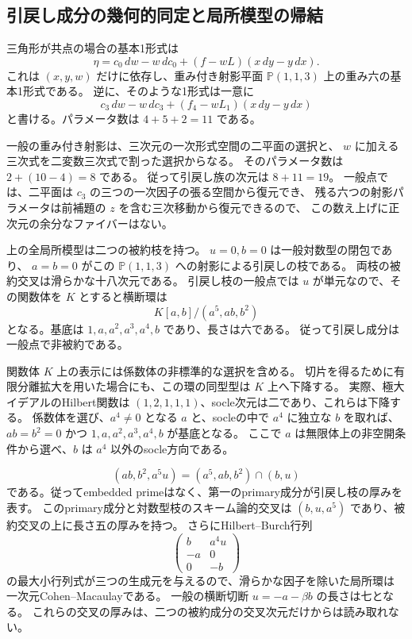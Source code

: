 \subsection{引戻し成分の幾何的同定と局所模型の帰結}

三角形が共点の場合の基本1形式は
\[
 \eta=c_0\,dw-w\,dc_0+(f-wL)(x\,dy-y\,dx).
\]
これは $(x,y,w)$ だけに依存し、重み付き射影平面
$\mathbb P(1,1,3)$ 上の重み六の基本1形式である。
逆に、そのような1形式は一意に
\[
 c_3\,dw-w\,dc_3+(f_4-wL_1)(x\,dy-y\,dx)
\]
と書ける。パラメータ数は $4+5+2=11$ である。

一般の重み付き射影は、三次元の一次形式空間の二平面の選択と、
$w$ に加える三次式を二変数三次式で割った選択からなる。
そのパラメータ数は $2+(10-4)=8$ である。
従って引戻し族の次元は $8+11=19$。
一般点では、二平面は $c_3$ の三つの一次因子の張る空間から復元でき、
残る六つの射影パラメータは前補題の $z$ を含む三次移動から復元できるので、
この数え上げに正次元の余分なファイバーはない。

上の全局所模型は二つの被約枝を持つ。
$u=0,b=0$ は一般対数型の閉包であり、
$a=b=0$ がこの $\mathbb P(1,1,3)$ への射影による引戻しの枝である。
両枝の被約交叉は滑らかな十八次元である。
引戻し枝の一般点では $u$ が単元なので、その関数体を $K$ とすると横断環は
\[
 K[a,b]/(a^5,ab,b^2)
\]
となる。基底は $1,a,a^2,a^3,a^4,b$ であり、長さは六である。
従って引戻し成分は一般点で非被約である。

関数体 $K$ 上の表示には係数体の非標準的な選択を含める。
切片を得るために有限分離拡大を用いた場合にも、この環の同型型は $K$ 上へ下降する。
実際、極大イデアルのHilbert関数は $(1,2,1,1,1)$、socle次元は二であり、これらは下降する。
係数体を選び、$a^4\ne0$ となる $a$ と、socleの中で $a^4$ に独立な $b$ を取れば、
$ab=b^2=0$ かつ $1,a,a^2,a^3,a^4,b$ が基底となる。
ここで $a$ は無限体上の非空開条件から選べ、$b$ は $a^4$ 以外のsocle方向である。

\begin{remark}[二つのprimary成分と交叉の厚み]
\[
 (ab,b^2,a^5u)=(a^5,ab,b^2)\cap(b,u)
\]
である。従ってembedded primeはなく、第一のprimary成分が引戻し枝の厚みを表す。
このprimary成分と対数型枝のスキーム論的交叉は
$(b,u,a^5)$ であり、被約交叉の上に長さ五の厚みを持つ。
さらにHilbert--Burch行列
\[
 \begin{pmatrix}b&a^4u\\-a&0\\0&-b\end{pmatrix}
\]
の最大小行列式が三つの生成元を与えるので、滑らかな因子を除いた局所環は
一次元Cohen--Macaulayである。
一般の横断切断 $u=-a-\beta b$ の長さは七となる。
これらの交叉の厚みは、二つの被約成分の交叉次元だけからは読み取れない。
\end{remark}
